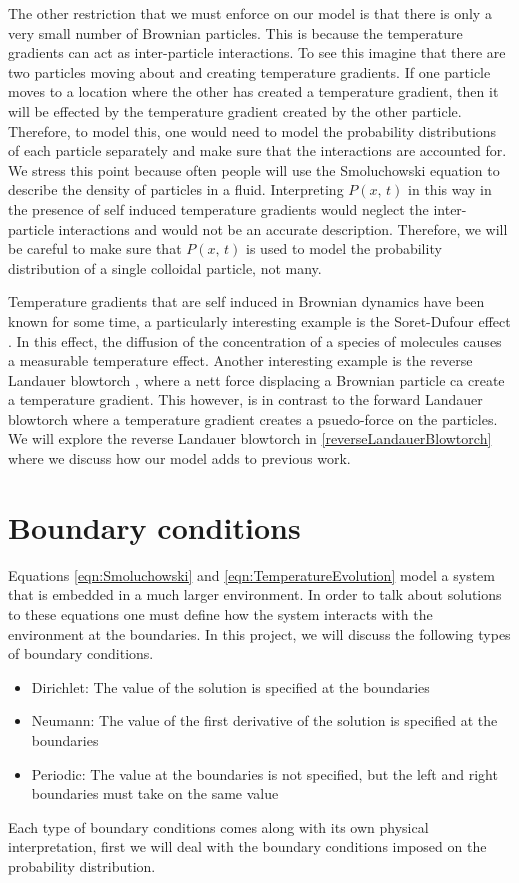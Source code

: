 The other restriction that we must enforce on our model is that there is only a very small number of Brownian particles. This is because the temperature gradients can act as inter-particle interactions. To see this imagine that there are two particles moving about and creating temperature gradients. If one particle moves to a location where the other has created a temperature gradient, then it will be effected by the temperature gradient created by the other particle. Therefore, to model this, one would need to model the probability distributions of each particle separately and make sure that the interactions are accounted for. We stress this point because often people will use the Smoluchowski equation to describe the density of particles in a fluid. Interpreting $P(x, \, t)$ in this way in the presence of self induced temperature gradients would neglect the inter-particle interactions and would not be an accurate description. Therefore, we will be careful to make sure that $P(x, \, t)$ is used to model the probability distribution of a single colloidal particle, not many.  

Temperature gradients that are self induced in Brownian dynamics have been known for some time, a particularly interesting example is the Soret-Dufour effect \cite{Onsager1931,HortLinzLuecke1992,PiazzaGuarino2002,Santamaria-HolekGadomskiRubi2011}. In this effect, the diffusion of the concentration of a species of molecules causes a measurable temperature effect. Another interesting example is the reverse Landauer blowtorch \cite{DasDasBarikEtAl2015}, where a nett force displacing a Brownian particle ca create a temperature gradient. This however, is in contrast to the forward Landauer blowtorch where a temperature gradient creates a psuedo-force on the particles. We will explore the reverse Landauer blowtorch in \autoref{reverseLandauerBlowtorch} where we discuss how our model adds to previous work.

\section{Boundary conditions}
Equations \ref{eqn:Smoluchowski} and \ref{eqn:TemperatureEvolution} model a system that is embedded in a much larger environment. In order to talk about solutions to these equations one must define how the system interacts with the environment at the boundaries. In this project, we will discuss the following types of boundary conditions.

\begin{itemize}
\item{Dirichlet: The value of the solution is specified at the boundaries}
\item{Neumann: The value of the first derivative of the solution is specified at the boundaries}
\item{Periodic: The value at the boundaries is not specified, but the left and right boundaries must take on the same value}
\end{itemize}
Each type of boundary conditions comes along with its own physical interpretation, first we will deal with the boundary conditions imposed on the probability distribution.

